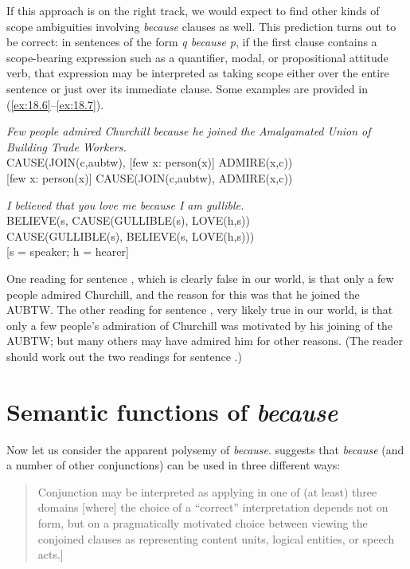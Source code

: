 If this approach is on the right track, we would expect to find other kinds of scope ambiguities involving \textit{because} clauses as well. This prediction turns out to be correct: in sentences of the form \textit{q because p}, if the first clause contains a scope-bearing expression such as a quantifier, modal, or propositional attitude verb, that expression may be interpreted as taking scope either over the entire sentence or just over its immediate clause. Some examples are provided in (\ref{ex:18.6}--\ref{ex:18.7}).


\ea \label{ex:18.6}
\textit{Few people admired Churchill because he joined the Amalgamated Union of Building Trade Workers.}\\
\ea  CAUSE(JOIN(c,aubtw), [few x: person(x)] ADMIRE(x,c))\\
\ex{} [few x: person(x)] CAUSE(JOIN(c,aubtw), ADMIRE(x,c))
                       \z
\z

\ea \label{ex:18.7}
\textit{I believed that you love me because I am gullible.}\\
\ea  BELIEVE(s, CAUSE(GULLIBLE(s), LOVE(h,s))\\
\ex CAUSE(GULLIBLE(s), BELIEVE(s, LOVE(h,s)))\\
    {}[s = speaker; h = hearer]
                       \z
\z


One reading for sentence , which is clearly false in our world, is that only a few people admired Churchill, and the reason for this was that he joined the AUBTW. The other reading for sentence , very likely true in our world, is that only a few people’s admiration of Churchill was motivated by his joining of the AUBTW; but many others may have admired him for other reasons. (The reader should work out the two readings for sentence .)


\section{Semantic functions of  \textit{because}}\label{sec:18.3}

Now let us consider the apparent polysemy of \textit{because}. \citet[76--78]{Sweetser1990} suggests that \textit{because} (and a number of other conjunctions) can be used in three different ways: 


\begin{quote}
Conjunction may be interpreted as applying in one of (at least) three domains [where] the choice of a “correct” interpretation depends not on form, but on a pragmatically motivated choice between viewing the conjoined clauses as representing content units, logical entities, or speech acts.\newline [\citeyear[78]{Sweetser1990}]
\end{quote}

